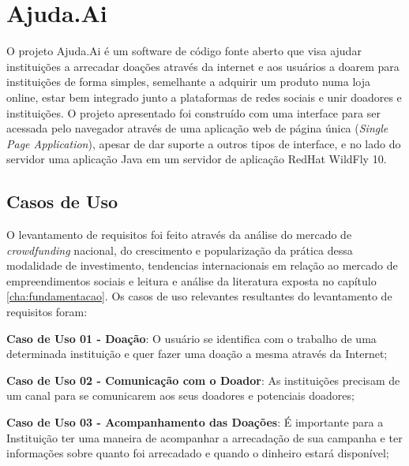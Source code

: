 \chapter{Ajuda.Ai} \label{cha:ajudaai}

O projeto Ajuda.Ai é um software de código fonte aberto que visa ajudar instituições a arrecadar doações através da internet e aos usuários a doarem para instituições de forma simples, semelhante a adquirir um produto numa loja online, estar bem integrado junto a plataformas de redes sociais e unir doadores e instituições. O projeto apresentado foi construído com uma interface para ser acessada pelo navegador através de uma aplicação web de página única (\emph{Single Page Application}), apesar de dar suporte a outros tipos de interface, e no lado do servidor uma aplicação Java em um servidor de aplicação RedHat WildFly 10.





\section{Casos de Uso} \label{sec:ajudaai:casos}

O levantamento de requisitos foi feito através da análise do mercado de \emph{crowdfunding} nacional, do crescimento e popularização da prática dessa modalidade de investimento, tendencias internacionais em relação ao mercado de empreendimentos sociais e leitura e análise da literatura exposta no capítulo \ref{cha:fundamentacao}. Os casos de uso relevantes resultantes do levantamento de requisitos foram:

\begin{lista}
  \item \textbf{Caso de Uso 01 - Doação}: O usuário se identifica com o trabalho de uma determinada instituição e quer fazer uma doação a mesma através da Internet;
  \item \textbf{Caso de Uso 02 - Comunicação com o Doador}: As instituições precisam de um canal para se comunicarem aos seus doadores e potenciais doadores;
  \item \textbf{Caso de Uso 03 - Acompanhamento das Doações}: É importante para a Instituição ter uma maneira de acompanhar a arrecadação de sua campanha e ter informações sobre quanto foi arrecadado e quando o dinheiro estará disponível;
\end{lista}

